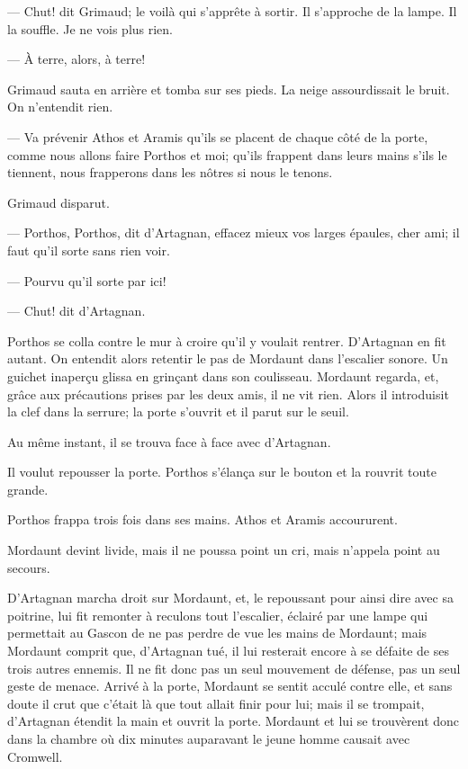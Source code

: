 — Chut! dit Grimaud; le voilà qui s'apprête à sortir. Il s'approche de la lampe. Il la souffle. Je ne vois plus rien.

— À terre, alors, à terre!

Grimaud sauta en arrière et tomba sur ses pieds. La neige assourdissait le bruit. On n'entendit rien.

— Va prévenir Athos et Aramis qu'ils se placent de chaque côté de la porte, comme nous allons faire Porthos et moi; qu'ils frappent dans leurs mains s'ils le tiennent, nous frapperons dans les nôtres si nous le tenons.

Grimaud disparut.

— Porthos, Porthos, dit d'Artagnan, effacez mieux vos larges épaules, cher ami; il faut qu'il sorte sans rien voir.

— Pourvu qu'il sorte par ici!

— Chut! dit d'Artagnan.

Porthos se colla contre le mur à croire qu'il y voulait rentrer. D'Artagnan en fit autant.
On entendit alors retentir le pas de Mordaunt dans l'escalier sonore. Un guichet inaperçu glissa en grinçant dans son coulisseau. Mordaunt regarda, et, grâce aux précautions prises par les deux amis, il ne vit rien. Alors il introduisit la clef dans la serrure; la porte s'ouvrit et il parut sur le seuil.

Au même instant, il se trouva face à face avec d'Artagnan.

Il voulut repousser la porte. Porthos s'élança sur le bouton et la rouvrit toute grande.

Porthos frappa trois fois dans ses mains. Athos et Aramis accoururent.

Mordaunt devint livide, mais il ne poussa point un cri, mais n'appela point au secours.

D'Artagnan marcha droit sur Mordaunt, et, le repoussant pour ainsi dire avec sa poitrine, lui fit remonter à reculons tout l'escalier, éclairé par une lampe qui permettait au Gascon de ne pas perdre de vue les mains de Mordaunt; mais Mordaunt comprit que, d'Artagnan tué, il lui resterait encore à se défaite de ses trois autres ennemis. Il ne fit donc pas un seul mouvement de défense, pas un seul geste de menace. Arrivé à la porte, Mordaunt se sentit acculé contre elle, et sans doute il crut que c'était là que tout allait finir pour lui; mais il se trompait, d'Artagnan étendit la main et ouvrit la porte. Mordaunt et lui se trouvèrent donc dans la chambre où dix minutes auparavant le jeune homme causait avec Cromwell.

